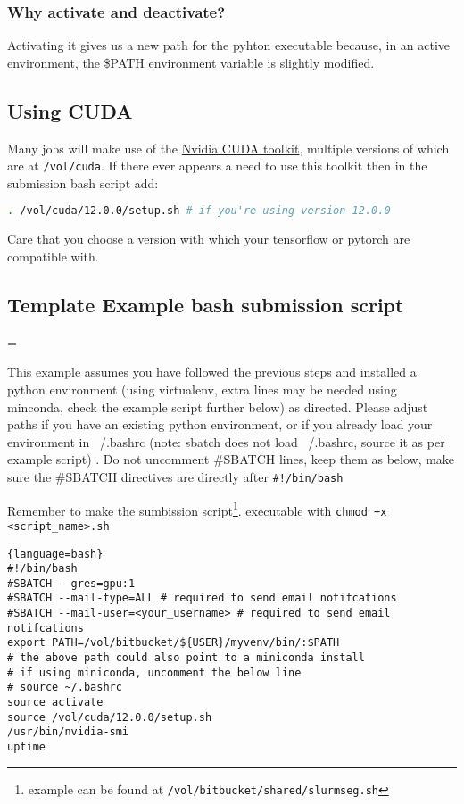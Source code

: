 \documentclass[11pt]{article}
\newenvironment{warning}
  {\par\begin{mdframed}[linewidth=1pt,linecolor=black]%
    \begin{list}{}{\leftmargin=1cm
                   \labelwidth=\leftmargin}\item[\Large\ding{43}]}
  {\end{list}\end{mdframed}\par}
\begin{document}
\subsubsection*{Why activate and deactivate?}

Activating it gives us a new path for the pyhton executable because, in an active environment, the \$PATH environment variable is slightly modified.

\subsection*{Using CUDA}

Many jobs will make use of the \href{https://developer.nvidia.com/cuda-toolkit}{Nvidia CUDA toolkit}, multiple versions of which are at \texttt{/vol/cuda}. If there ever appears a need to use this toolkit then in the submission bash script add:

\begin{lstlisting}[language=sh]
    . /vol/cuda/12.0.0/setup.sh # if you're using version 12.0.0
\end{lstlisting}

Care that you choose a version with which your tensorflow or pytorch are compatible with.

\subsection*{Template Example bash submission script}

\begin{warning}
    This example assumes you have followed the previous steps and installed a python environment (using virtualenv, extra lines may  be needed using minconda, check the example script further below) as directed. Please adjust paths if you have an existing python environment, or if you already load your environment in ~/.bashrc (note: sbatch does not load ~/.bashrc, source it as per example script) . Do not uncomment \#SBATCH lines, keep them as below, make sure the \#SBATCH directives are directly after \verb|#!/bin/bash|
\end{warning}

Remember to make the sumbission script\footnote{example can be found at \texttt{/vol/bitbucket/shared/slurmseg.sh}}. executable with \verb|chmod +x <script_name>.sh|

\begin{lstlisting}{language=bash}
#!/bin/bash
#SBATCH --gres=gpu:1
#SBATCH --mail-type=ALL # required to send email notifcations
#SBATCH --mail-user=<your_username> # required to send email notifcations
export PATH=/vol/bitbucket/${USER}/myvenv/bin/:$PATH
# the above path could also point to a miniconda install
# if using miniconda, uncomment the below line
# source ~/.bashrc
source activate
source /vol/cuda/12.0.0/setup.sh
/usr/bin/nvidia-smi
uptime
\end{lstlisting}
\end{document}
